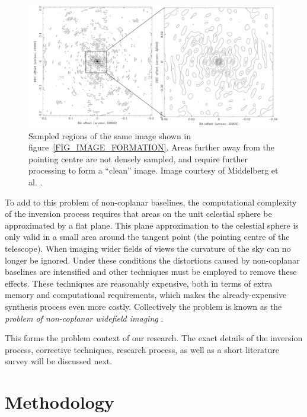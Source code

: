 \documentclass[a4paper, two column]{article}
\begin{document}
\begin{figure}[h]
 \begin{mdframed}
 \centering
 \includegraphics[width=1.0\textwidth]{psf.png}
 \caption[PSF]{Sampled regions of the same image shown in figure~\ref{FIG_IMAGE_FORMATION}. Areas further away from the pointing centre are not densely sampled, and require further processing to form a
 ``clean'' image. Image courtesy of Middelberg et al. \cite{middelberg2008high}.}
  \label{FIG_PSF}
 \end{mdframed}
\end{figure}

To add to this problem of non-coplanar baselines, the computational complexity of the inversion process requires that areas on the unit celestial sphere be approximated by a flat plane. This 
plane approximation to the celestial sphere is only valid in a small area around the tangent point (the pointing centre of the telescope). When imaging wider fields of views the curvature of the sky
can no longer be ignored. Under these conditions the distortions caused by non-coplanar baselines are intensified and other techniques must be employed to remove these effects. These techniques are
reasonably expensive, both in terms of extra memory and computational requirements, which makes the already-expensive synthesis process even more costly. Collectively the problem is known as the 
\textit{problem of non-coplanar widefield imaging} \cite{taylor1999synthesis}. 

This forms the problem context of our research. The exact details of the inversion process, corrective techniques, research process, as well as a short literature survey will be discussed next.

\section{Methodology}
\end{document}
